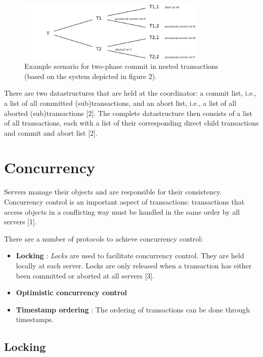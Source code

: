 \begin{figure}
	\begin{center}
		\includegraphics[width=0.8\textwidth]{img/twophasecommitnestedtransaction}
	\end{center}
	\caption{Example scenario for two-phase commit in nested transactions (based on the system depicted in figure 2).}
	\label{fig:twophasecommitnestedtransaction}
\end{figure}


There are two datastructures that are held at the coordinator: a commit list, i.e., a list of all committed (sub)transactions, and an abort list, i.e., a list of all aborted (sub)transactions [2]. The complete datastructure then consists of a list of all transactions, each with a list of their corresponding direct child transactions and commit and abort list [2].



\section{Concurrency}

Servers manage their objects and are responsible for their consistency. Concurrency control is an important aspect of transactions: transactions that access objects in a conflicting way must be handled in the same order by all servers [1].

There are a number of protocols to achieve concurrency control:
\begin{itemize}
	\item \textbf{Locking} : \emph{Locks} are used to facilitate concurrency control. They are held locally at each server. Locks are only released when a transaction has either been committed or aborted at all servers [3].
	\item \textbf{Optimistic concurrency control}
	\item \textbf{Timestamp ordering} : The ordering of transactions can be done through timestamps.
\end{itemize}

\subsection{Locking}


